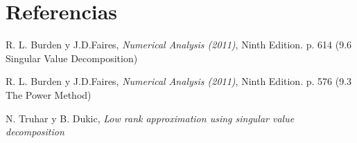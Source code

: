\section{Referencias}
\begin{thebibliography}{9}
R. L. Burden y J.D.Faires, \textit{Numerical Analysis (2011)}, Ninth Edition. p. 614 (9.6 Singular Value Decomposition)

R. L. Burden y J.D.Faires, \textit{Numerical Analysis (2011)}, Ninth Edition. p. 576 (9.3 The Power Method)

N. Truhar y B. Dukic, \textit{Low rank approximation using singular value decomposition}

\end{thebibliography}